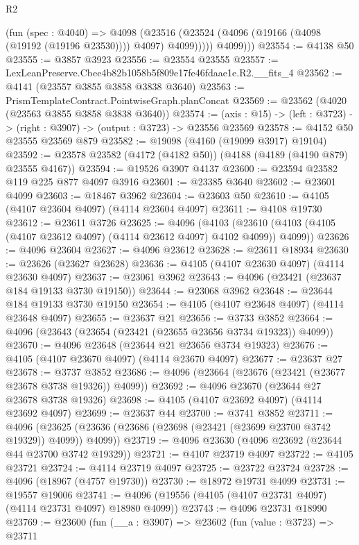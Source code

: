 \begin{lexlean}{R2}
\begin{coremodule}
              (fun (spec : @4040) =>
              @4098
                (@23516 (@23524 (@4096 (@19166 (@4098 (@19192 (@19196 @23530)))) @4097) @4099)))))
          @4099)))
@23554 := @4138 @50
@23555 := @3857 @3923
@23556 := @23554 @23555
@23557 := LexLeanPreserve.Cbee4b82b1058b5f809e17fe46fdaae1e.R2.__fits_4
@23562 := @4141 (@23557 @3855 @3858 @3838 @3640)
@23563 := PrismTemplateContract.PointwiseGraph.planConcat
@23569 := @23562 (@4020 (@23563 @3855 @3858 @3838 @3640))
@23574 := (axis : @15) -> (left : @3723) -> (right : @3907) -> (output : @3723) -> @23556 @23569
@23578 := @4152 @50 @23555 @23569 @879
@23582 := @19098 (@4160 (@19099 @3917) @19104)
@23592 := @23578 @23582 (@4172 (@4182 @50)) (@4188 (@4189 (@4190 @879) @23555 @4167))
@23594 := @19526 @3907 @4137
@23600 := @23594 @23582 @119 @225 @877 @4097 @3916
@23601 := @23385 @3640
@23602 := @23601 @4099
@23603 := @18467 @3962
@23604 := @23603 @50
@23610 := @4105 (@4107 @23604 @4097) (@4114 @23604 @4097)
@23611 := @4108 @19730
@23612 := @23611 @3726
@23625 := @4096
    (@4103 (@23610 (@4103 (@4105 (@4107 @23612 @4097) (@4114 @23612 @4097) @4102 @4099)) @4099))
@23626 := @4096 @23604
@23627 := @4096 @23612
@23628 := @23611 @18934
@23630 := @23626 (@23627 @23628)
@23636 := @4105 (@4107 @23630 @4097) (@4114 @23630 @4097)
@23637 := @23061 @3962
@23643 := @4096 (@23421 (@23637 @184 @19133 @3730 @19150))
@23644 := @23068 @3962
@23648 := @23644 @184 @19133 @3730 @19150
@23654 := @4105 (@4107 @23648 @4097) (@4114 @23648 @4097)
@23655 := @23637 @21
@23656 := @3733 @3852
@23664 := @4096 (@23643 (@23654 (@23421 (@23655 @23656 @3734 @19323)) @4099))
@23670 := @4096 @23648 (@23644 @21 @23656 @3734 @19323)
@23676 := @4105 (@4107 @23670 @4097) (@4114 @23670 @4097)
@23677 := @23637 @27
@23678 := @3737 @3852
@23686 := @4096 (@23664 (@23676 (@23421 (@23677 @23678 @3738 @19326)) @4099))
@23692 := @4096 @23670 (@23644 @27 @23678 @3738 @19326)
@23698 := @4105 (@4107 @23692 @4097) (@4114 @23692 @4097)
@23699 := @23637 @44
@23700 := @3741 @3852
@23711 := @4096
    (@23625 (@23636 (@23686 (@23698 (@23421 (@23699 @23700 @3742 @19329)) @4099)) @4099))
@23719 := @4096 @23630 (@4096 @23692 (@23644 @44 @23700 @3742 @19329))
@23721 := @4107 @23719 @4097
@23722 := @4105 @23721
@23724 := @4114 @23719 @4097
@23725 := @23722 @23724
@23728 := @4096 (@18967 (@4757 @19730))
@23730 := @18972 @19731 @4099
@23731 := @19557 @19006
@23741 := @4096 (@19556 (@4105 (@4107 @23731 @4097) (@4114 @23731 @4097) @18980 @4099))
@23743 := @4096 @23731 @18990
@23769 := @23600
    (fun (__a : @3907) =>
    @23602
      (fun (value : @3723) =>
      @23711

\end{coremodule}
\end{lexlean}
